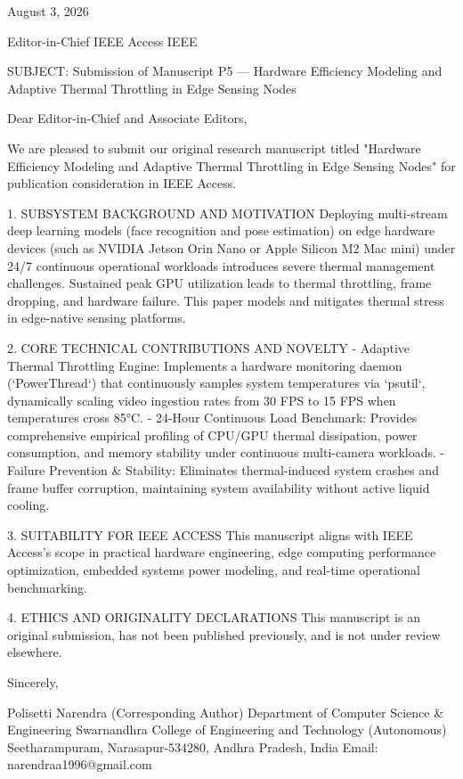 August 3, 2026

Editor-in-Chief
IEEE Access
IEEE

SUBJECT: Submission of Manuscript P5 — Hardware Efficiency Modeling and Adaptive Thermal Throttling in Edge Sensing Nodes

Dear Editor-in-Chief and Associate Editors,

We are pleased to submit our original research manuscript titled "Hardware Efficiency Modeling and Adaptive Thermal Throttling in Edge Sensing Nodes" for publication consideration in IEEE Access.

1. SUBSYSTEM BACKGROUND AND MOTIVATION
Deploying multi-stream deep learning models (face recognition and pose estimation) on edge hardware devices (such as NVIDIA Jetson Orin Nano or Apple Silicon M2 Mac mini) under 24/7 continuous operational workloads introduces severe thermal management challenges. Sustained peak GPU utilization leads to thermal throttling, frame dropping, and hardware failure. This paper models and mitigates thermal stress in edge-native sensing platforms.

2. CORE TECHNICAL CONTRIBUTIONS AND NOVELTY
  - Adaptive Thermal Throttling Engine: Implements a hardware monitoring daemon (`PowerThread`) that continuously samples system temperatures via `psutil`, dynamically scaling video ingestion rates from 30 FPS to 15 FPS when temperatures cross 85°C.
  - 24-Hour Continuous Load Benchmark: Provides comprehensive empirical profiling of CPU/GPU thermal dissipation, power consumption, and memory stability under continuous multi-camera workloads.
  - Failure Prevention & Stability: Eliminates thermal-induced system crashes and frame buffer corruption, maintaining system availability without active liquid cooling.

3. SUITABILITY FOR IEEE ACCESS
This manuscript aligns with IEEE Access's scope in practical hardware engineering, edge computing performance optimization, embedded systems power modeling, and real-time operational benchmarking.

4. ETHICS AND ORIGINALITY DECLARATIONS
This manuscript is an original submission, has not been published previously, and is not under review elsewhere.

Sincerely,

Polisetti Narendra (Corresponding Author)
Department of Computer Science & Engineering
Swarnandhra College of Engineering and Technology (Autonomous)
Seetharampuram, Narasapur-534280, Andhra Pradesh, India
Email: narendraa1996@gmail.com
